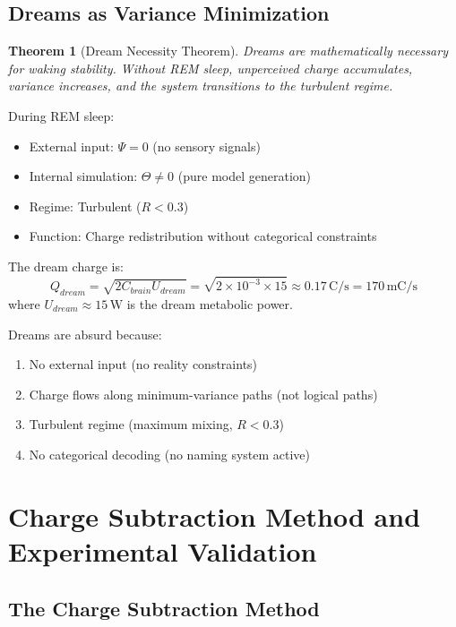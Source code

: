 \documentclass[12pt,a4paper]{article}
\newtheorem{theorem}{Theorem}[section]
\begin{document}
\subsection{Dreams as Variance Minimization}

\begin{theorem}[Dream Necessity Theorem]
Dreams are mathematically necessary for waking stability. Without REM sleep, unperceived charge accumulates, variance increases, and the system transitions to the turbulent regime.
\end{theorem}

During REM sleep:
\begin{itemize}
\item External input: $\Psi = 0$ (no sensory signals)
\item Internal simulation: $\Theta \neq 0$ (pure model generation)
\item Regime: Turbulent ($R < 0.3$)
\item Function: Charge redistribution without categorical constraints
\end{itemize}

The dream charge is:
\begin{equation}
Q_{dream} = \sqrt{2 C_{brain} U_{dream}} = \sqrt{2 \times 10^{-3} \times 15} \approx 0.17 \, \text{C/s} = 170 \, \text{mC/s}
\end{equation}
where $U_{dream} \approx 15 \, \text{W}$ is the dream metabolic power.

Dreams are absurd because:
\begin{enumerate}
\item No external input (no reality constraints)
\item Charge flows along minimum-variance paths (not logical paths)
\item Turbulent regime (maximum mixing, $R < 0.3$)
\item No categorical decoding (no naming system active)
\end{enumerate}

\section{Charge Subtraction Method and Experimental Validation}

\subsection{The Charge Subtraction Method}
\end{document}
